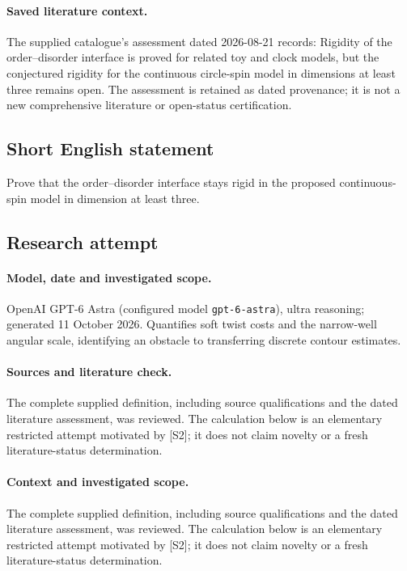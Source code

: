 \documentclass[11pt]{article}
\begin{document}
\paragraph{Saved literature context.} The supplied catalogue's assessment dated 2026-08-21 records: Rigidity of the order--disorder interface is proved for related toy and clock models, but the conjectured rigidity for the continuous circle-spin model in dimensions at least three remains open. The assessment is retained as dated provenance; it is not a new comprehensive literature or open-status certification.
\subsection{Short English statement}
Prove that the order--disorder interface stays rigid in the proposed continuous-spin model in dimension at least three.
\subsection{Research attempt}
\paragraph{Model, date and investigated scope.}
OpenAI GPT-6 Astra (configured model \texttt{gpt-6-astra}), ultra reasoning; generated 11 October 2026. Quantifies soft twist costs and the narrow-well angular scale, identifying an obstacle to transferring discrete contour estimates.

\paragraph{Sources and literature check.}
The complete supplied definition, including source qualifications and the dated literature assessment, was reviewed. The calculation below is an elementary restricted attempt motivated by [S2]; it does not claim novelty or a fresh literature-status determination.

\paragraph{Context and investigated scope.} The complete supplied definition, including source qualifications and the dated literature assessment, was reviewed. The calculation below is an elementary restricted attempt motivated by [S2]; it does not claim novelty or a fresh literature-status determination.
\end{document}
